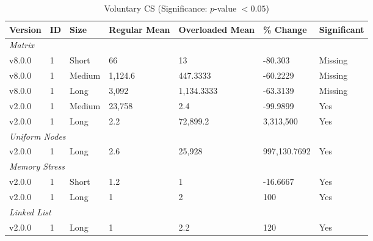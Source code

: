 \begin{table}[H]\caption{Voluntary CS (Significance: $p$-value $<0.05$)}
\centering\footnotesize\setlength{\tabcolsep}{4pt}\renewcommand{\arraystretch}{1.15}
\begin{tabular}{lllllll}
\toprule
Version & ID & Size & Regular Mean & Overloaded Mean & \% Change & Significant \\ \midrule
\multicolumn{7}{l}{\textit{Matrix}} \\
v8.0.0 & 1 & Short & 66 & 13 & -80.303 & Missing \\
v8.0.0 & 1 & Medium & 1,124.6 & 447.3333 & -60.2229 & Missing \\
v8.0.0 & 1 & Long & 3,092 & 1,134.3333 & -63.3139 & Missing \\
v2.0.0 & 1 & Medium & 23,758 & 2.4 & -99.9899 & Yes \\
v2.0.0 & 1 & Long & 2.2 & 72,899.2 & 3,313,500 & Yes \\
\multicolumn{7}{l}{\textit{Uniform Nodes}} \\
v2.0.0 & 1 & Long & 2.6 & 25,928 & 997,130.7692 & Yes \\
\multicolumn{7}{l}{\textit{Memory Stress}} \\
v2.0.0 & 1 & Short & 1.2 & 1 & -16.6667 & Yes \\
v2.0.0 & 1 & Long & 1 & 2 & 100 & Yes \\
\multicolumn{7}{l}{\textit{Linked List}} \\
v2.0.0 & 1 & Long & 1 & 2.2 & 120 & Yes \\
\bottomrule\end{tabular}
\label{VoluntaryContextSwitchMetrics}
\par\smallskip\parbox{0.95\textwidth}{\scriptsize}
\end{table}

